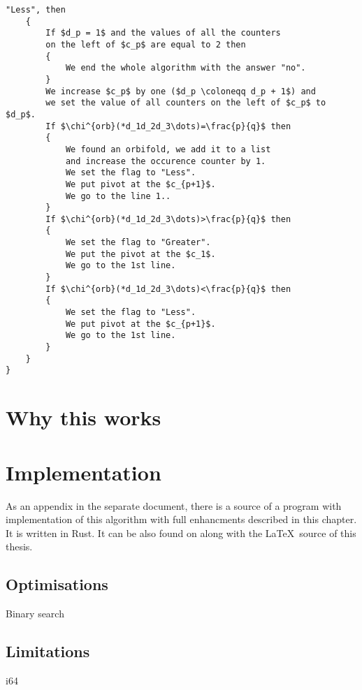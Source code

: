 \begin{lstlisting}[firstnumber=1,consecutivenumbers=true]
    "Less", then 
    {
        If $d_p = 1$ and the values of all the counters 
        on the left of $c_p$ are equal to 2 then 
        {
            We end the whole algorithm with the answer "no".
        }
        We increase $c_p$ by one ($d_p \coloneqq d_p + 1$) and
        we set the value of all counters on the left of $c_p$ to $d_p$.
        If $\chi^{orb}(*d_1d_2d_3\dots)=\frac{p}{q}$ then
        {
            We found an orbifold, we add it to a list 
            and increase the occurence counter by 1. 
            We set the flag to "Less".
            We put pivot at the $c_{p+1}$.
            We go to the line 1..
        }
        If $\chi^{orb}(*d_1d_2d_3\dots)>\frac{p}{q}$ then  
        {
            We set the flag to "Greater".
            We put the pivot at the $c_1$. 
            We go to the 1st line.
        } 
        If $\chi^{orb}(*d_1d_2d_3\dots)<\frac{p}{q}$ then
        {
            We set the flag to "Less".
            We put pivot at the $c_{p+1}$.
            We go to the 1st line.
        } 
    }
}
\end{lstlisting}

\section{Why this works}

\section{Implementation}\label{implementation}
As an appendix in the separate document, there is a source of a program with implementation 
of this algorithm 
with full  
enhancments described in this chapter. It is written in Rust. 
It can be also found on  along with the \LaTeX\ source of 
this thesis.

\subsection{Optimisations}
Binary search

\subsection{Limitations}
i64

